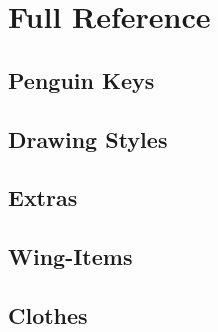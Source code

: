 \documentclass[parskip=half,english,noenddot,numbers=noenddot,footnotes=nomultiple,oneside]{scrartcl}
\begin{document}
\appendix
\section{Full Reference}\label{sec:full-ref}

\subsection{Penguin Keys}

\subsection{Drawing Styles}

\subsection{Extras}

\subsection{Wing-Items}

\subsection{Clothes}
\end{document}
